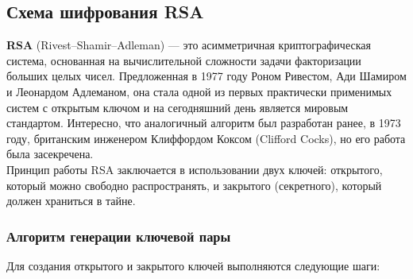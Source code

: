\subsection{Схема шифрования RSA}

\textbf{RSA} (Rivest–Shamir–Adleman) — это асимметричная криптографическая система, основанная на вычислительной сложности задачи факторизации больших целых чисел. Предложенная в 1977 году Роном Ривестом, Ади Шамиром и Леонардом Адлеманом, она стала одной из первых практически применимых систем с открытым ключом и на сегодняшний день является мировым стандартом. Интересно, что аналогичный алгоритм был разработан ранее, в 1973 году, британским инженером Клиффордом Коксом (Clifford Cocks), но его работа была засекречена.\\

\noindent Принцип работы RSA заключается в использовании двух ключей: открытого, который можно свободно распространять, и закрытого (секретного), который должен храниться в тайне.

\subsubsection{Алгоритм генерации ключевой пары}
Для создания открытого и закрытого ключей выполняются следующие шаги:

